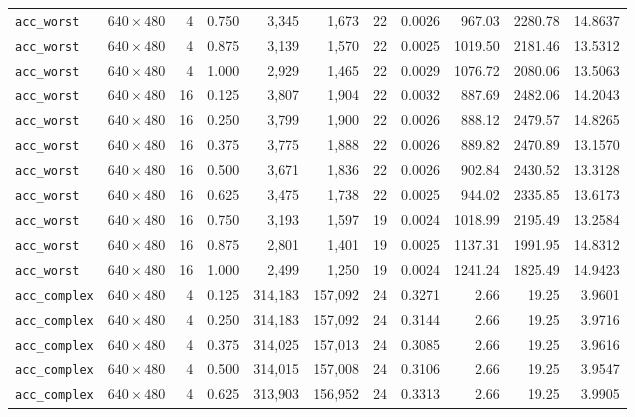 \documentclass{article}
\begin{document}
{\begin{longtable}{@{}llrrrrrrrrr@{}}
\texttt{acc\_worst}   & $640\times 480$  & 4  & 0.750 & 3{,}345   & 1{,}673   & 22 & 0.0026 & 967.03  & 2280.78 & 14.8637 \\
\texttt{acc\_worst}   & $640\times 480$  & 4  & 0.875 & 3{,}139   & 1{,}570   & 22 & 0.0025 & 1019.50 & 2181.46 & 13.5312 \\
\texttt{acc\_worst}   & $640\times 480$  & 4  & 1.000 & 2{,}929   & 1{,}465   & 22 & 0.0029 & 1076.72 & 2080.06 & 13.5063 \\
\texttt{acc\_worst}   & $640\times 480$  & 16 & 0.125 & 3{,}807   & 1{,}904   & 22 & 0.0032 & 887.69  & 2482.06 & 14.2043 \\
\texttt{acc\_worst}   & $640\times 480$  & 16 & 0.250 & 3{,}799   & 1{,}900   & 22 & 0.0026 & 888.12  & 2479.57 & 14.8265 \\
\texttt{acc\_worst}   & $640\times 480$  & 16 & 0.375 & 3{,}775   & 1{,}888   & 22 & 0.0026 & 889.82  & 2470.89 & 13.1570 \\
\texttt{acc\_worst}   & $640\times 480$  & 16 & 0.500 & 3{,}671   & 1{,}836   & 22 & 0.0026 & 902.84  & 2430.52 & 13.3128 \\
\texttt{acc\_worst}   & $640\times 480$  & 16 & 0.625 & 3{,}475   & 1{,}738   & 22 & 0.0025 & 944.02  & 2335.85 & 13.6173 \\
\texttt{acc\_worst}   & $640\times 480$  & 16 & 0.750 & 3{,}193   & 1{,}597   & 19 & 0.0024 & 1018.99 & 2195.49 & 13.2584 \\
\texttt{acc\_worst}   & $640\times 480$  & 16 & 0.875 & 2{,}801   & 1{,}401   & 19 & 0.0025 & 1137.31 & 1991.95 & 14.8312 \\
\texttt{acc\_worst}   & $640\times 480$  & 16 & 1.000 & 2{,}499   & 1{,}250   & 19 & 0.0024 & 1241.24 & 1825.49 & 14.9423 \\
\addlinespace
\texttt{acc\_complex} & $640\times 480$  & 4  & 0.125 & 314{,}183 & 157{,}092 & 24 & 0.3271 & 2.66    & 19.25   & 3.9601  \\
\texttt{acc\_complex} & $640\times 480$  & 4  & 0.250 & 314{,}183 & 157{,}092 & 24 & 0.3144 & 2.66    & 19.25   & 3.9716  \\
\texttt{acc\_complex} & $640\times 480$  & 4  & 0.375 & 314{,}025 & 157{,}013 & 24 & 0.3085 & 2.66    & 19.25   & 3.9616  \\
\texttt{acc\_complex} & $640\times 480$  & 4  & 0.500 & 314{,}015 & 157{,}008 & 24 & 0.3106 & 2.66    & 19.25   & 3.9547  \\
\texttt{acc\_complex} & $640\times 480$  & 4  & 0.625 & 313{,}903 & 156{,}952 & 24 & 0.3313 & 2.66    & 19.25   & 3.9905  \\

\end{longtable}}
\end{document}
